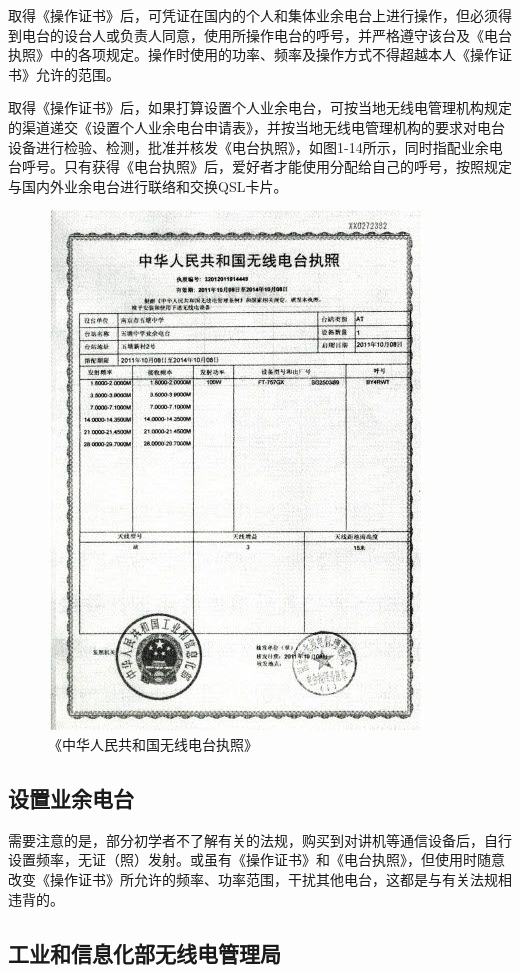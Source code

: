 \documentclass[12pt,UTF8]{ctexbook}
\begin{document}
取得《操作证书》后，可凭证在国内的个人和集体业余电台上进行操作，但必须得到电台的设台人或负责人同意，使用所操作电台的呼号，并严格遵守该台及《电台执照》中的各项规定。操作时使用的功率、频率及操作方式不得超越本人《操作证书》允许的范围。

取得《操作证书》后，如果打算设置个人业余电台，可按当地无线电管理机构规定的渠道递交《设置个人业余电台申请表》，并按当地无线电管理机构的要求对电台设备进行检验、检测，批准并核发《电台执照》，如图1-14所示，同时指配业余电台呼号。只有获得《电台执照》后，爱好者才能使用分配给自己的呼号，按照规定与国内外业余电台进行联络和交换QSL卡片。

\begin{figure}[htbp]
	\centering
	\includegraphics[width=0.7\linewidth]{14}
	\caption{《中华人民共和国无线电台执照》}
	\label{fig:1}
\end{figure}

\subsection{设置业余电台}

需要注意的是，部分初学者不了解有关的法规，购买到对讲机等通信设备后，自行设置频率，无证（照）发射。或虽有《操作证书》和《电台执照》，但使用时随意改变《操作证书》所允许的频率、功率范围，干扰其他电台，这都是与有关法规相违背的。

\subsection{工业和信息化部无线电管理局}
\end{document}
